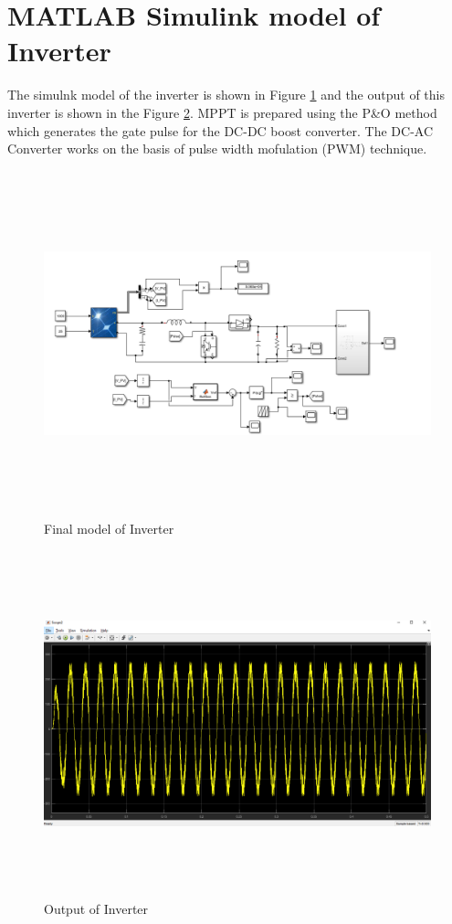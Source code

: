 \documentclass[a4paper,12pt]{iitmdiss}
\begin{document}
\section{MATLAB Simulink model of Inverter}

The simulnk model of the inverter is shown in Figure \ref{fig:3.6} and the output of this inverter is shown in the Figure \ref{fig:3.7}. MPPT is prepared using the P\&O method which generates the gate pulse for the DC-DC boost converter. The DC-AC Converter works on the basis of pulse width mofulation (PWM) technique.

\begin{figure}[hbt!]
    \centering
    \includegraphics[width=18cm,height=10cm]{Final DC_DC_AC(1).png}
    \caption{Final model of Inverter}
    \label{fig:3.6}
\end{figure}

\begin{figure}[hbt!]
    \centering
    \includegraphics[width=15.8cm,height=10cm]{Final result DC-AC(1).png}
    \caption{Output of Inverter}
    \label{fig:3.7}
\end{figure}
\end{document}
